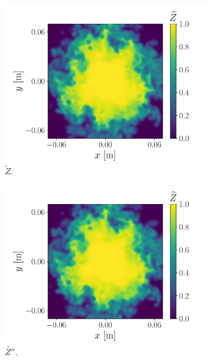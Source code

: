 \documentclass[review]{elsarticle}
\newcommand{\wt}[1]{\widetilde{#1}}
\begin{document}
\begin{figure}[!tbp]%
  \centering%
  \begin{subfigure}[t]{0.48\textwidth}%
    \includegraphics[page=1,width=\textwidth, trim=0.4cm 0cm 1.4cm 0cm, clip=true]{./figs/dice_0004_slice.pdf}%
    \caption{$\wt{Z}$.}%
  \end{subfigure}\hfill%
  \begin{subfigure}[t]{0.48\textwidth}%
    \includegraphics[page=2,width=\textwidth, trim=0.4cm 0cm 1.4cm 0cm, clip=true]{./figs/dice_0004_slice.pdf}%
    \caption{$\wt{Z''}$.}%
  \end{subfigure}\\%
  \begin{subfigure}[t]{0.48\textwidth}%

\end{subfigure}
\end{figure}
\end{document}

